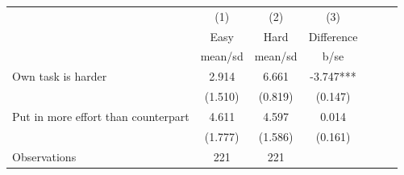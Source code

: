 {
\def\sym#1{\ifmmode^{#1}\else\(^{#1}\)\fi}
\begin{tabular}{l*{3}{cc}}
\hline\hline
                    &\multicolumn{1}{c}{(1)}&\multicolumn{1}{c}{(2)}&\multicolumn{1}{c}{(3)}\\
                    &\multicolumn{1}{c}{Easy}&\multicolumn{1}{c}{Hard}&\multicolumn{1}{c}{Difference}\\
                    &     mean/sd&     mean/sd&        b/se   \\
\hline
Own task is harder  &       2.914&       6.661&      -3.747***\\
                    &     (1.510)&     (0.819)&     (0.147)   \\
Put in more effort than counterpart&       4.611&       4.597&       0.014   \\
                    &     (1.777)&     (1.586)&     (0.161)   \\
\hline
Observations        &         221&         221&               \\
\hline\hline
\end{tabular}
}
